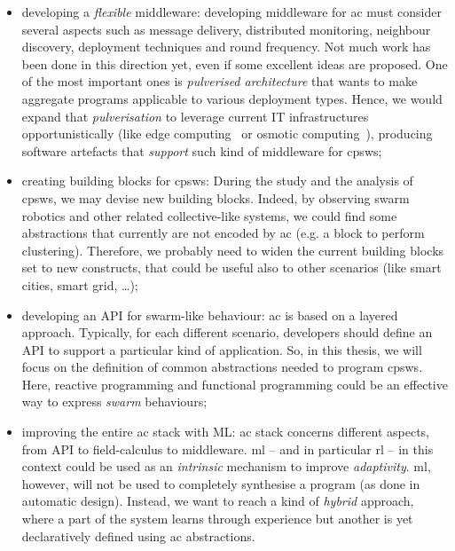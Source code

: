 \documentclass[11pt]{article}
\begin{document}
\begin{itemize}
	\item developing a \textit{flexible} middleware: 
	developing middleware for \ac{ac} must consider several aspects such as message delivery, distributed monitoring, neighbour discovery, deployment techniques and round frequency. 
	Not much work has been done in this direction yet, even if some excellent ideas are proposed. 
	One of the most important ones is \emph{pulverised architecture}\cite{DBLP:journals/fi/CasadeiPPVW20} that wants to make aggregate programs applicable to various deployment types.
	Hence, we would expand that \emph{pulverisation} to leverage current IT infrastructures opportunistically (like edge computing~\cite{DBLP:journals/computer/Satyanarayanan17} or osmotic computing~\cite{DBLP:journals/cloudcomp/VillariFDRR16}), producing software artefacts that \textit{support} such kind of middleware for \acp{cpsw};
	\item creating building blocks for \acp{cpsw}: During the study and the analysis of \acp{cpsw}, we may devise new building blocks. 
	Indeed, by observing swarm robotics and other related collective-like systems, we could find some abstractions that currently are not encoded by \ac{ac} (e.g. a block to perform clustering).
	Therefore, we probably need to widen the current building blocks set to new constructs, that could be useful also to other scenarios (like smart cities, smart grid, \dots{});
	\item developing an API for swarm-like behaviour: \ac{ac} is based on a layered approach. 
	Typically, for each different scenario, developers should define an API to support a particular kind of application. 
	So, in this thesis, we will focus on the definition of common abstractions needed to program \acp{cpsw}. 
	Here, reactive programming and functional programming could be an effective way to express \textit{swarm} behaviours; %
	\item improving the entire \ac{ac} stack with ML: \ac{ac} stack concerns different aspects, from API to field-calculus to middleware. 
	\ac{ml} -- and in particular \ac{rl} -- in this context could be used as an \emph{intrinsic} mechanism to improve \emph{adaptivity}. 
	\ac{ml}, however, will not be used to completely synthesise a program (as done in automatic design). Instead, we want to reach a kind of \textit{hybrid} approach, where a part of the system learns through experience but another is yet declaratively defined using \ac{ac} abstractions.
\end{itemize}
\end{document}
